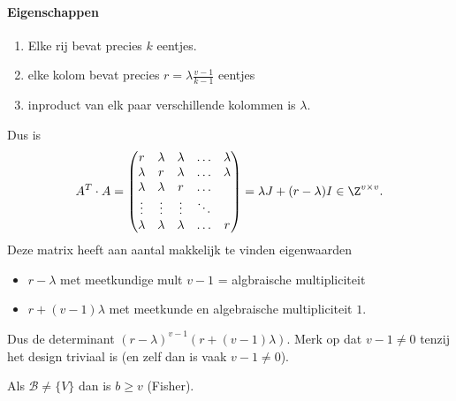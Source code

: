 \paragraph{Eigenschappen}
\begin{eigenschap}
	\begin{enumerate}
		\item Elke rij bevat precies $k$ eentjes.
		\item elke kolom bevat precies $r = \lambda \frac{v - 1}{k-1}$ eentjes
		\item inproduct van elk paar verschillende kolommen is $\lambda$. 
	\end{enumerate}
\end{eigenschap}
Dus is  \[
	A^{T}\cdot A = \begin{pmatrix} r & \lambda & \lambda & \ldots & \lambda \\ 
	\lambda & r & \lambda & \ldots & \lambda \\
\lambda & \lambda & r & \ldots  \\
\vdots & \vdots & \vdots & \ddots \\ 
\lambda & \lambda & \lambda & \ldots & r\end{pmatrix}  
= \lambda J + (r - \lambda)I \in \Z^{v\times v}
.\] 
Deze matrix heeft aan aantal makkelijk te vinden eigenwaarden
\begin{itemize}
	\item $r - \lambda$ met meetkundige mult $v -1$ = algbraische multipliciteit
	\item  $r + (v - 1)\lambda$ met meetkunde en algebraische multipliciteit $1$.
\end{itemize}
Dus de determinant $(r - \lambda)^{v -1}(r + (v - 1)\lambda)$. Merk op dat $v - 1 \ne 0$ tenzij het design triviaal is (en zelf dan is vaak $v - 1 \ne 0$). 

\begin{stelling}
	Als $\mathcal{B} \ne \{ V\} $ dan is $b \ge v$ (Fisher).
\end{stelling}

